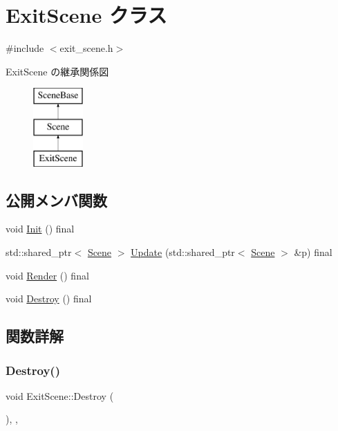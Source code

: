 \hypertarget{class_exit_scene}{}\section{Exit\+Scene クラス}
\label{class_exit_scene}


{\ttfamily \#include $<$exit\+\_\+scene.\+h$>$}

Exit\+Scene の継承関係図\begin{figure}[H]
\begin{center}
\leavevmode
\includegraphics[height=3.000000cm]{class_exit_scene}
\end{center}
\end{figure}
\subsection*{公開メンバ関数}
\begin{DoxyCompactItemize}
\item 
void \mbox{\hyperlink{class_exit_scene_a10f6018b0c4c639d0e8756885dbc834c}{Init}} () final
\item 
std\+::shared\+\_\+ptr$<$ \mbox{\hyperlink{class_scene}{Scene}} $>$ \mbox{\hyperlink{class_exit_scene_a18655f3124150a911f266e66e3fc4480}{Update}} (std\+::shared\+\_\+ptr$<$ \mbox{\hyperlink{class_scene}{Scene}} $>$ \&p) final
\item 
void \mbox{\hyperlink{class_exit_scene_aecf5de52db863695794ee0b0e68a4ad0}{Render}} () final
\item 
void \mbox{\hyperlink{class_exit_scene_afc24a09da4a553109f813566f5d04da8}{Destroy}} () final
\end{DoxyCompactItemize}


\subsection{関数詳解}
\mbox{\label{class_exit_scene_afc24a09da4a553109f813566f5d04da8}} 
\subsubsection{\texorpdfstring{Destroy()}{Destroy()}}
{\footnotesize\ttfamily void Exit\+Scene\+::\+Destroy (\begin{DoxyParamCaption}{ }\end{DoxyParamCaption})\hspace{0.3cm}{\ttfamily [inline]}, {\ttfamily [final]}, {\ttfamily [virtual]}}



